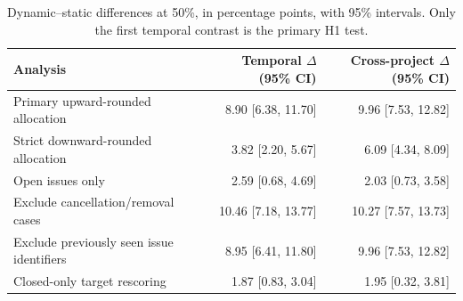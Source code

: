 \begin{table}[htbp]
\centering\footnotesize\setlength{\tabcolsep}{4pt}
\caption{Dynamic--static differences at 50\%, in percentage points, with 95\% intervals. Only the first temporal contrast is the primary H1 test.}\label{tab:03_sensitivity}
\begin{tabular}{@{}lrr@{}}
\toprule
Analysis & \shortstack{Temporal $\Delta$\\(95\% CI)} & \shortstack{Cross-project $\Delta$\\(95\% CI)} \\
\midrule
Primary upward-rounded allocation & 8.90 {[}6.38, 11.70{]} & 9.96 {[}7.53, 12.82{]} \\
Strict downward-rounded allocation & 3.82 {[}2.20, 5.67{]} & 6.09 {[}4.34, 8.09{]} \\
Open issues only & 2.59 {[}0.68, 4.69{]} & 2.03 {[}0.73, 3.58{]} \\
Exclude cancellation/removal cases & 10.46 {[}7.18, 13.77{]} & 10.27 {[}7.57, 13.73{]} \\
Exclude previously seen issue identifiers & 8.95 {[}6.41, 11.80{]} & 9.96 {[}7.53, 12.82{]} \\
Closed-only target rescoring & 1.87 {[}0.83, 3.04{]} & 1.95 {[}0.32, 3.81{]} \\
\bottomrule
\end{tabular}
\end{table}
